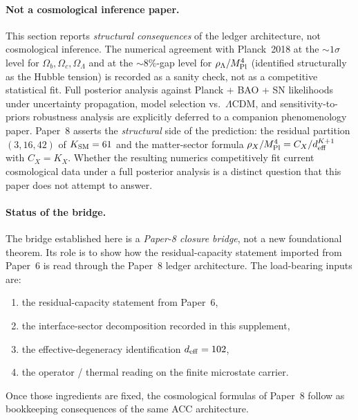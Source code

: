 \documentclass[11pt]{article}
\theoremstyle{plain}
\theoremstyle{definition}
\theoremstyle{remark}
\newcommand{\Mpl}{M_{\rm Pl}}
\begin{document}
\paragraph{Not a cosmological inference paper.}  This section reports \emph{structural consequences} of the ledger architecture, not cosmological inference.  The numerical agreement with Planck~2018 at the $\sim 1\sigma$ level for $\Omega_b, \Omega_c, \Omega_\Lambda$ and at the $\sim 8\%$-gap level for $\rho_\Lambda/\Mpl^4$ (identified structurally as the Hubble tension) is recorded as a sanity check, not as a competitive statistical fit.  Full posterior analysis against Planck + BAO + SN likelihoods under uncertainty propagation, model selection vs.\ $\Lambda$CDM, and sensitivity-to-priors robustness analysis are explicitly deferred to a companion phenomenology paper.  Paper~8 asserts the \emph{structural} side of the prediction: the residual partition $(3, 16, 42)$ of $K_{\rm SM} = 61$ and the matter-sector formula $\rho_X / \Mpl^4 = C_X / d_{\rm eff}^{K+1}$ with $C_X = K_X$.  Whether the resulting numerics competitively fit current cosmological data under a full posterior analysis is a distinct question that this paper does not attempt to answer.

\paragraph{Status of the bridge.}
The bridge established here is a \emph{Paper-8 closure bridge}, not a new foundational theorem.  Its role is to show how the residual-capacity statement imported from Paper~6 is read through the Paper~8 ledger architecture.  The load-bearing inputs are:
\begin{enumerate}[leftmargin=2.5em,label=\textup{(\roman*)}]
  \item the residual-capacity statement from Paper~6,
  \item the interface-sector decomposition recorded in this supplement,
  \item the effective-degeneracy identification $d_{\rm eff} = 102$,
  \item the operator / thermal reading on the finite microstate carrier.
\end{enumerate}
Once those ingredients are fixed, the cosmological formulas of Paper~8 follow as bookkeeping consequences of the same ACC architecture.
\end{document}
